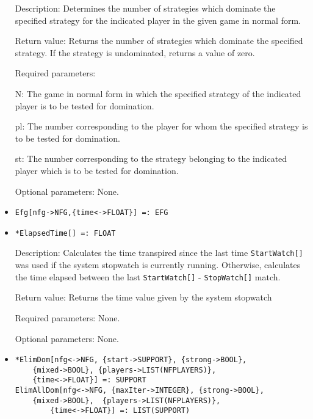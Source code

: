 \begin{itemize}
\bd
\item
[Description:] Determines the number of strategies which dominate the
specified strategy for the indicated player in the given game in
normal form.
\item
[Return value:] Returns the number of strategies which dominate the
specified strategy.  If the strategy is undominated, returns a value
of zero.
\item
[Required parameters:]\hfil\null

\bd
\item
[N:] The game in normal form in which the specified strategy of the
indicated player is to be tested for domination.
\item
[pl:] The number corresponding to the player for whom the specified
strategy is to be tested for domination.
\item
[st:] The number corresponding to the strategy belonging to the
indicated player which is to be tested for domination.
\ed

\item
[Optional parameters:] None.
\ed



\item
\protect \large \begin{verbatim}
Efg[nfg->NFG,{time<->FLOAT}] =: EFG
\end{verbatim}\normalsize

\item

\protect \large \begin{verbatim}
*ElapsedTime[] =: FLOAT
\end{verbatim}\normalsize

\bd
\item
[Description:] Calculates the time transpired since the last time
\verb+StartWatch[]+ was used if the system stopwatch is currently running.
Otherwise, calculates the time elapsed between the last
\verb+StartWatch[]+ - \verb+StopWatch[]+ match.
\item
[Return value:] Returns the time value given by the system stopwatch
\item
[Required parameters:] None.
\item   
[Optional parameters:] None.
\ed

\item
\protect \large \begin{verbatim}
*ElimDom[nfg<->NFG, {start->SUPPORT}, {strong->BOOL}, 
	{mixed->BOOL}, {players->LIST(NFPLAYERS)}, 
	{time<->FLOAT}] =: SUPPORT
ElimAllDom[nfg<->NFG, {maxIter->INTEGER}, {strong->BOOL}, 
	{mixed->BOOL},	{players->LIST(NFPLAYERS)},
        {time<->FLOAT}] =: LIST(SUPPORT)
\end{verbatim} \normalsize


\end{itemize}
